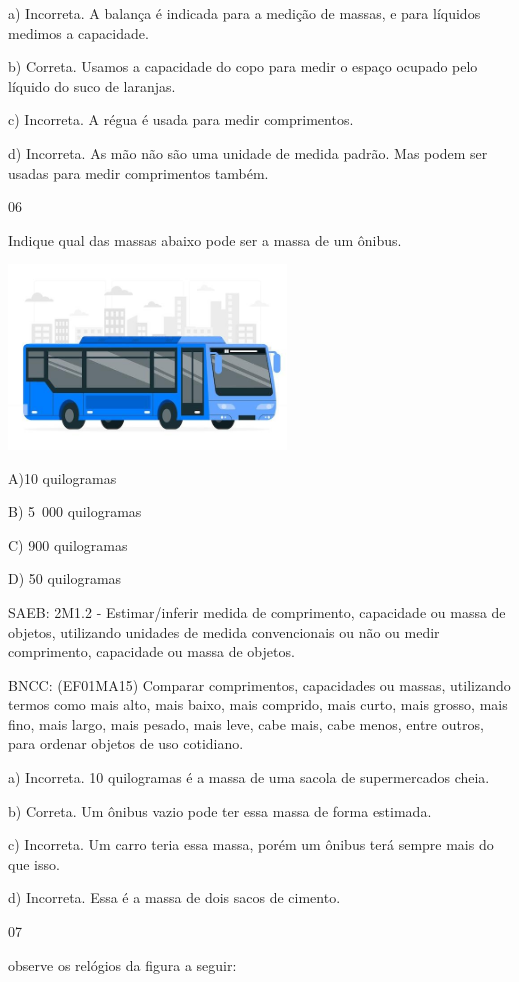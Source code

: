 \begin{itemize}
\begin{itemize}
a) Incorreta. A balança é indicada para a medição de massas, e para
líquidos medimos a capacidade.

b) Correta. Usamos a capacidade do copo para medir o espaço ocupado pelo
líquido do suco de laranjas.

c) Incorreta. A régua é usada para medir comprimentos.

d) Incorreta. As mão não são uma unidade de medida padrão. Mas podem ser
usadas para medir comprimentos também.

\num{06}

Indique qual das massas abaixo pode ser a massa de um ônibus.

\includegraphics[width=2.90249in,height=1.93351in]{media/image153.jpg}

A)10 quilogramas

B) 5~000 quilogramas

C) 900 quilogramas

D) 50 quilogramas

SAEB: 2M1.2 - Estimar/inferir medida de comprimento, capacidade ou massa
de objetos, utilizando unidades de medida convencionais ou não ou medir
comprimento, capacidade ou massa de objetos.

BNCC: (EF01MA15) Comparar comprimentos, capacidades ou massas,
utilizando termos como mais alto, mais baixo, mais comprido, mais curto,
mais grosso, mais fino, mais largo, mais pesado, mais leve, cabe mais,
cabe menos, entre outros, para ordenar objetos de uso cotidiano.

a) Incorreta. 10 quilogramas é a massa de uma sacola de supermercados
cheia.

b) Correta. Um ônibus vazio pode ter essa massa de forma estimada.

c) Incorreta. Um carro teria essa massa, porém um ônibus terá sempre
mais do que isso.

d) Incorreta. Essa é a massa de dois sacos de cimento.

\num{07}

observe os relógios da figura a seguir:


\end{itemize}
\end{itemize}
